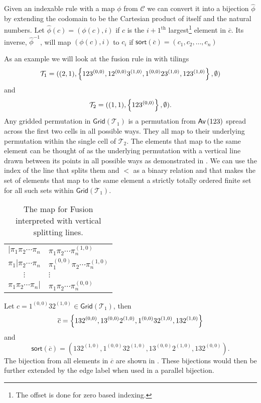 Given an indexable rule with a map $\phi$ from $\mathcal{C}$ we can convert it into a bijection 
$\hat{\phi}$ by extending the codomain to be the Cartesian product of itself and the natural numbers. Let $\hat{\phi}(c) = (\phi(c),i)$ if $c$ is the $i+1^\text{th}$ largest\footnote{The offset is done for zero based indexing.} element in $\overline{c}$. Its inverse, $\hat{\phi}^{-1}$, will map $(\phi(c),i)$ to $c_i$ if $\textsf{sort}(\overline{c}) = (c_1,c_2,\dotsc,c_n)$

As an example we will look at the fusion rule in  with tilings
\[
    \mathcal{T}_1 = ((2,1), \left\{123^{(0,0)},12^{(0,0)}3^{(1,0)},1^{(0,0)}23^{(1,0)},123^{(1,0)}\right\}, \emptyset)
\]
and
\[
    \mathcal{T}_2 = ((1,1),\left\{123^{(0,0)}\right\}, \emptyset).
\]
Any gridded permutation in $\textsf{Grid}(\mathcal{T}_1)$ is a permutation from $\textsf{Av}\left(123\right)$ spread across the first two cells in all possible ways. They all map to their underlying permutation within the single cell of $\mathcal{T}_2$. The elements that map to the same element can be thought of as the underlying permutation with a vertical line drawn between its points in all possible ways as demonstrated in . We can use the index of the line that splits them and $<$ as a binary relation and that makes the set of elements that map to the same element a strictly totally ordered finite set for all such sets within $\textsf{Grid}(\mathcal{T}_1)$.

\begin{table}[ht!]
    \centering
    \begin{tabular}{c|l}
        $|\pi_1\pi_2\dotsm\pi_n$ & $\pi_1\pi_2\dotsm\pi_n^{(1,0)}$ \\
        $\pi_1|\pi_2\dotsm\pi_n$ & $\pi_1^{(0,0)}\pi_2\dotsm\pi_n^{(1,0)}$ \\
        $\vdots$ & \hspace{1cm}$\vdots$ \\
        $\pi_1\pi_2\dotsm\pi_n|$ & $\pi_1\pi_2\dotsm\pi_n^{(0,0)}$ \\
    \end{tabular}
    \caption{The map for Fusion interpreted with vertical splitting lines.}
    \label{tab:fuseline}
\end{table}

Let $c = 1^{(0,0)}32^{(1,0)} \in \textsf{Grid}(\mathcal{T}_1)$, then
\[
    \overline{c} = \left\{132^{(0,0)},13^{(0,0)}2^{(1,0)}, 1^{(0,0)}32^{(1,0)}, 132^{(1,0)}\right\}
\]
and 
\[
    \textsf{sort}(\overline{c}) = \left(132^{(1,0)},1^{(0,0)}32^{(1,0)},13^{(0,0)}2^{(1,0)},132^{(0,0)}\right).
\]
The bijection from all elements in $\overline{c}$ are shown in . These bijections would then be further extended by the edge label when used in a parallel bijection.

